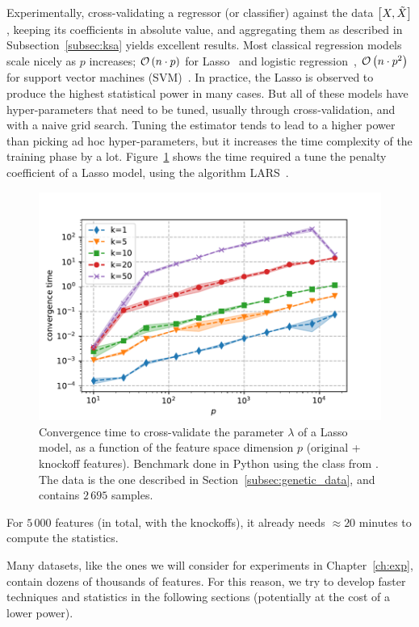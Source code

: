Experimentally, cross-validating a regressor (or classifier) against the data $\big[ X, \tilde{X} \big]$,
keeping its coefficients in absolute value,
and aggregating them as described in Subsection~\ref{subsec:ksa} yields excellent results.
Most classical regression models scale nicely as $p$ increases;
$\mathcal{O}\left( n \cdot p \right)$ for Lasso~\citep{lasso} and logistic regression~\citep{logistic_regression},
$\mathcal{O}\left( n \cdot p^2 \right)$ for support vector machines (SVM)~\citep{svm}.
In practice, the Lasso is observed to produce the highest statistical power in many cases.
But all of these models have hyper-parameters that need to be tuned,
usually through cross-validation,
and with a naive grid search.
Tuning the estimator tends to lead to a higher power than picking ad hoc hyper-parameters,
but it increases the time complexity of the training phase by a lot.
Figure~\ref{fig:lasso_times} shows the time required a tune the penalty coefficient of a Lasso model,
using the algorithm LARS~\citep{lars}.
\begin{figure}
    \centering
    \includegraphics[width=0.8\linewidth, height=0.5\linewidth]{figures/low_rank_times.pdf}
    \caption{
        Convergence time to cross-validate the parameter $\lambda$ of a Lasso model,
        as a function of the feature space dimension $p$ (original + knockoff features).
        Benchmark done in Python using the class  from .
        The data is the one described in Section~\ref{subsec:genetic_data},
        and contains $2\,695$ samples.
    }
    \label{fig:lasso_times}
\end{figure}
For $5\,000$ features (in total, with the knockoffs),
it already needs $\approx 20$ minutes to compute the statistics.

Many datasets, like the ones we will consider for experiments in Chapter~\ref{ch:exp},
contain dozens of thousands of features.
For this reason, we try to develop faster techniques and statistics in the following sections
(potentially at the cost of a lower power).

